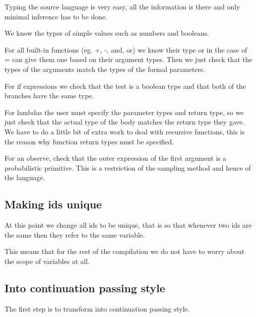 \documentclass[a4paper]{article}
\begin{document}
Typing the source language is very easy, all the information is there and only minimal inference has to be done.

We know the types of simple values such as numbers and booleans.

For all built-in functions (eg. +, -, and, or) we know their type or in the case of = can give them one based on their argument types. Then we just check that the types of the arguments match the types of the formal parameters.

For if expressions we check that the test is a boolean type and that both of the branches have the same type.

For lambdas the user must specify the parameter types and return type, so we just check that the actual type of the body matches the return type they gave. We have to do a little bit of extra work to deal with recursive functions, this is the reason why function return types must be specified.

For an observe, check that the outer expression of the first argument is a probabilistic primitive. This is a restriction of the sampling method and hence of the language.




\subsection{Making ids unique}

At this point we change all ids to be unique, that is so that whenever two ids are the same then they refer to the same variable.

This means that for the rest of the compilation we do not have to worry about the scope of variables at all.




\subsection{Into continuation passing style}

The first step is to transform into continuation passing style.
\end{document}
